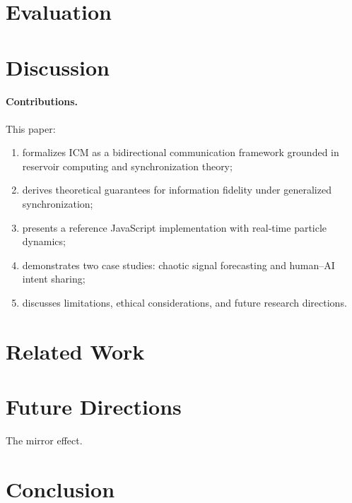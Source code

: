 \documentclass[12pt]{article}
\begin{document}
\section{Evaluation}

\section{Discussion}
\paragraph{Contributions.} This paper:
\begin{enumerate}[topsep=2pt,itemsep=2pt,parsep=0pt]
    \item formalizes ICM as a bidirectional communication framework grounded in reservoir computing and synchronization theory;
    \item derives theoretical guarantees for information fidelity under generalized synchronization;
    \item presents a reference JavaScript implementation with real‑time particle dynamics;
    \item demonstrates two case studies: chaotic signal forecasting and human–AI intent sharing;
    \item discusses limitations, ethical considerations, and future research directions.
\end{enumerate}
\section{Related Work}

\section{Future Directions}
The mirror effect.
\section{Conclusion}

\end{document}
